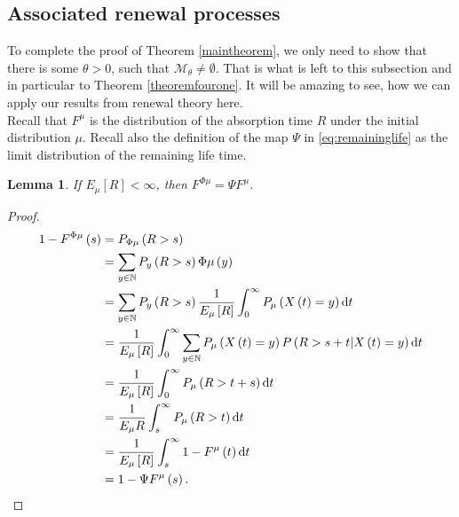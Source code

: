 \documentclass[12pt,a4paper]{scrartcl}
\newtheorem{lemma}[theorem]{Lemma}
\numberwithin{equation}{section}
\newcommand{\N}{\mathbb{N}} %
\begin{document}
\subsection{Associated renewal processes}

To complete the proof of Theorem \ref{maintheorem}, we only need to show that there is some $\theta > 0$, such that $\mathcal{M}_{\theta} \neq \emptyset.$ That is what is left to this subsection and in particular to Theorem \ref{theoremfourone}. It will be amazing to see, how we can apply our results from renewal theory here. \\[2ex]

Recall that $F^{\mu}$ is the distribution of the absorption time $R$ under the initial distribution $ \mu $. Recall also the definition of the map $ \Psi $ in \eqref{eq:remaininglife} as the limit distribution of the remaining life time.

\begin{lemma}
If $ E_{\mu} \left[R\right] < \infty $, then $ F^{\Phi\mu} = \Psi F^{\mu} $.
\end{lemma}

\begin{proof}
\begin{equation}
\label{eq:somecalculation}
\begin{aligned}
1 - F^{\Phi\mu}\left(s\right) &=
P_{\Phi\mu}\left(R>s\right) \\
&= \sum_{y \in \N} P_y\left(R > s \right) \Phi\mu\left(y\right)  \\
&= \sum_{y \in \N} P_y\left(R > s \right) \frac{1}{E_{\mu}\left[R\right]} \int_0^\infty P_{\mu}\left(X\left(t\right) = y\right) \textnormal{d}t \\
&= \frac{1}{E_{\mu}\left[R\right]} \int_0^\infty \sum_{y \in \N} P_{\mu}\left(X\left(t\right) = y\right) P\left(R > s + t | X\left(t\right) = y \right) \textnormal{d}t \\
&= \frac{1}{E_{\mu}\left[R\right]} \int_0^\infty P_{\mu}\left(R > t+s\right) \textnormal{d}t \\
&= \frac{1}{E_{\mu} R} \int_s^{\infty} P_{\mu}\left(R > t\right) \textnormal{d}t \\
& = \frac{1}{E_{\mu}\left[R\right]} \int_s^\infty 1 - F^{\mu}\left(t\right) \textnormal{d}t \\
 &= 1 - \Psi F^{\mu}\left(s\right).
\end{aligned}
\end{equation}
\end{proof}
\end{document}
